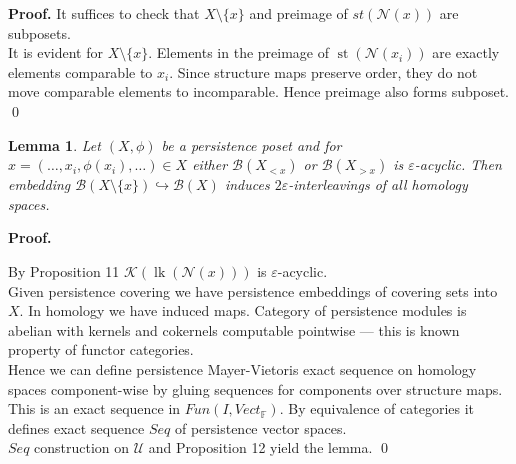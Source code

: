 \documentclass[a4paper, 12pt]{article}
\newtheorem{lemma}{Lemma}
\theoremstyle{definition}
\theoremstyle{remark}
\newenvironment{pf}{\noindent\textbf{Proof.}}{\qed}
\begin{document}
\begin{pf}
  It suffices to check that $X \setminus \{x\}$ and preimage of $st(\mathcal{N}(x))$ are subposets.\\

  It is evident for $X \setminus \{x\}$. Elements in the preimage of $\operatorname{st}(\mathcal{N}(x_i))$ are exactly elements comparable to $x_i$. Since structure maps preserve order, they do not move comparable elements to incomparable. Hence preimage also forms subposet.
\end{pf}\\

\begin{lemma}
  Let $(X,\phi)$ be a persistence poset and for $x=(\ldots,x_i,\phi(x_i),\ldots) \in X$ either $\mathcal{B}(X_{< x})$ or $\mathcal{B}(X_{> x})$ is $\varepsilon$-acyclic. Then embedding $\mathcal{B}(X \setminus \{x\}) \hookrightarrow \mathcal{B}(X)$ induces $2\varepsilon$-interleavings of all homology spaces.
\end{lemma}

\begin{pf} ~ \par
  By Proposition 11 $\mathcal{K}(\operatorname{lk}(\mathcal{N}(x)))$ is $\varepsilon$-acyclic.\\

  Given persistence covering we have persistence embeddings of covering sets into $X$. In homology we have induced maps. Category of persistence modules is abelian with kernels and cokernels computable pointwise --- this is known property of functor categories.\\

  Hence we can define persistence Mayer-Vietoris exact sequence on homology spaces component-wise by gluing sequences for components over structure maps. This is an exact sequence in $Fun(I,Vect_{\mathbb{F}})$. By equivalence of categories it defines exact sequence $Seq$ of persistence vector spaces.\\

  $Seq$ construction on $\mathcal{U}$ and Proposition 12 yield the lemma.
\end{pf}
\end{document}
